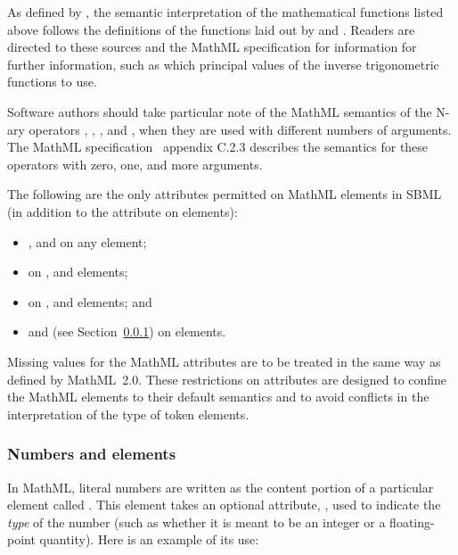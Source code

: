 As defined by \mathmltwo, the semantic interpretation of the
mathematical functions listed above follows the definitions of the
functions laid out by \cite{abramowitz:1997} and
\cite{zwillinger:1988}.  Readers are directed to these sources and
the MathML specification for information for further information,
such as which principal values of the inverse trigonometric functions to
use.

Software authors should take particular note of the MathML
semantics of the N-ary operators , ,
,  and , when they are used with
different numbers of arguments.  The MathML
specification~\citep{w3c:2000b} appendix C.2.3 describes the
semantics for these operators with zero, one, and more arguments.

The following are the only attributes permitted on MathML elements
in SBML (in addition to the  attribute on
 elements):
\begin{itemize}\setlength{\parskip}{-0.2ex}

\item {},  and  on any element;

\item {} on ,
     and  elements;

\item {} on , 
    and  elements; and

\item {} and 
  (see Section~\ref{sec:cn-token}) on  elements.

\end{itemize}\vspace*{-0.75ex}
Missing values for the MathML attributes are to be treated in the
same way as defined by MathML~2.0.  These restrictions on
attributes are designed to confine the MathML elements to their
default semantics and to avoid conflicts in the interpretation of
the type of token elements.


\subsubsection{Numbers and  elements}
\label{sec:cn-token}
\label{sec:mathml-value-space}

In MathML, literal numbers are written as the content portion of a
particular element called .  This element takes an
optional attribute, , used to indicate the \emph{type}
of the number (such as whether it is meant to be an integer or a
floating-point quantity).  Here is an example of its use:


